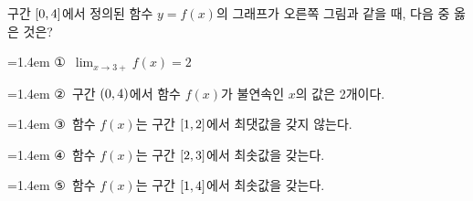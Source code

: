 \noindent\begin{minipage}[t]{0.58\linewidth}\vspace{0pt}\raggedright 구간 $[0{,}\mkern3mu\mathopen{}4]$에서 정의된 함수 $y=f(x)$의 그래프가 오른쪽 그림과 같을 때, 다음 중 옳은 것은?\end{minipage}\hfill\begin{minipage}[t]{0.4\linewidth}\vspace{0pt}\centering \resizebox{\ifdim\width>\linewidth\linewidth\else\width\fi}{!}{}\end{minipage}\par
\par\medskip\par\noindent\hangindent=1.4em {\small ①}\ $\displaystyle\lim_{x\to 3+} f(x)=2$\par\noindent\hangindent=1.4em {\small ②}\ 구간 $(0{,}\mkern3mu\mathopen{}4)$에서 함수 $f(x)$가 불연속인 $x$의 값은 2개이다.\par\noindent\hangindent=1.4em {\small ③}\ 함수 $f(x)$는 구간 $[1{,}\mkern3mu\mathopen{}2]$에서 최댓값을 갖지 않는다.\par\noindent\hangindent=1.4em {\small ④}\ 함수 $f(x)$는 구간 $[2{,}\mkern3mu\mathopen{}3]$에서 최솟값을 갖는다.\par\noindent\hangindent=1.4em {\small ⑤}\ 함수 $f(x)$는 구간 $[1{,}\mkern3mu\mathopen{}4]$에서 최솟값을 갖는다.\par\medskip
